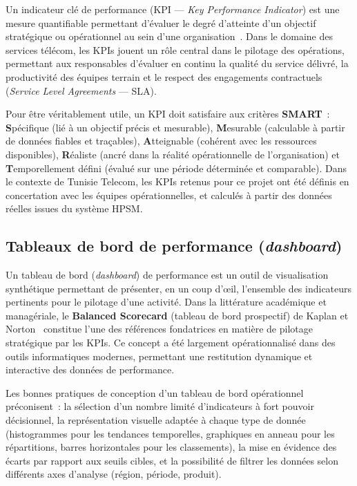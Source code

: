 \documentclass[10pt,a4paper]{report}
\begin{document}
Un indicateur clé de performance (KPI --- \textit{Key Performance Indicator}) est une mesure quantifiable permettant d'évaluer le degré d'atteinte d'un objectif stratégique ou opérationnel au sein d'une organisation~\cite{rockart1979}. Dans le domaine des services télécom, les KPIs jouent un rôle central dans le pilotage des opérations, permettant aux responsables d'évaluer en continu la qualité du service délivré, la productivité des équipes terrain et le respect des engagements contractuels (\textit{Service Level Agreements} --- SLA).

Pour être véritablement utile, un KPI doit satisfaire aux critères \textbf{SMART}~: \textbf{S}pécifique (lié à un objectif précis et mesurable), \textbf{M}esurable (calculable à partir de données fiables et traçables), \textbf{A}tteignable (cohérent avec les ressources disponibles), \textbf{R}éaliste (ancré dans la réalité opérationnelle de l'organisation) et \textbf{T}emporellement défini (évalué sur une période déterminée et comparable). Dans le contexte de Tunisie Telecom, les KPIs retenus pour ce projet ont été définis en concertation avec les équipes opérationnelles, et calculés à partir des données réelles issues du système HPSM.

\subsection{Tableaux de bord de performance (\textit{dashboard})}

Un tableau de bord (\textit{dashboard}) de performance est un outil de visualisation synthétique permettant de présenter, en un coup d'{\oe}il, l'ensemble des indicateurs pertinents pour le pilotage d'une activité. Dans la littérature académique et managériale, le \textbf{Balanced Scorecard} (tableau de bord prospectif) de Kaplan et Norton~\cite{kaplan1996} constitue l'une des références fondatrices en matière de pilotage stratégique par les KPIs. Ce concept a été largement opérationnalisé dans des outils informatiques modernes, permettant une restitution dynamique et interactive des données de performance.

Les bonnes pratiques de conception d'un tableau de bord opérationnel préconisent~: la sélection d'un nombre limité d'indicateurs à fort pouvoir décisionnel, la représentation visuelle adaptée à chaque type de donnée (histogrammes pour les tendances temporelles, graphiques en anneau pour les répartitions, barres horizontales pour les classements), la mise en évidence des écarts par rapport aux seuils cibles, et la possibilité de filtrer les données selon différents axes d'analyse (région, période, produit).
\end{document}
